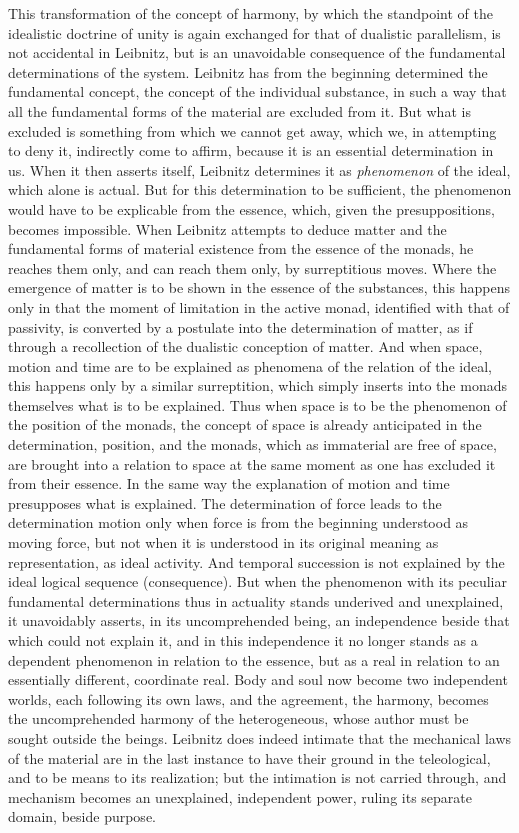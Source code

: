 This transformation of the concept of harmony, by which the standpoint
of the idealistic doctrine of unity is again exchanged for that of
dualistic parallelism, is not accidental in Leibnitz, but is an
unavoidable consequence of the fundamental determinations of the system.
Leibnitz has from the beginning determined the fundamental concept, the
concept of the individual substance, in such a way that all the
fundamental forms of the material are excluded from it. But what is
excluded is something from which we cannot
get away, which we, in attempting to deny it, indirectly come
to affirm, because it is an essential determination in us. When it then
asserts itself, Leibnitz determines it as \emph{phenomenon} of the
ideal, which alone is actual. But for this determination to be
sufficient, the phenomenon would have to be explicable from the
essence, which, given the presuppositions, becomes impossible. When
Leibnitz attempts to deduce matter and the fundamental forms of material
existence from the essence of the monads, he reaches them only, and can
reach them only, by surreptitious moves. Where the emergence of matter
is to be shown in the essence of the substances, this happens only in
that the moment of limitation in the active monad, identified with that
of passivity, is converted by a postulate into the determination of
matter, as if through a recollection of the dualistic conception of
matter. And when space, motion and time are to be explained as
phenomena of the relation of the ideal, this happens only by a similar
surreptition, which simply inserts into the monads themselves what is
to be explained. Thus when space is to be the phenomenon of the
position of the monads, the concept of space is already anticipated in
the determination, position, and the monads, which as immaterial are
free of space, are brought into a relation to space at the same moment
as one has excluded it from their essence. In the same way the
explanation of motion and time presupposes what is explained. The
determination of force leads to the determination motion only when
force is from the beginning understood as moving force, but not when it
is understood in its original meaning as representation, as ideal
activity. And temporal succession is not explained by the ideal logical
sequence (consequence). But when the phenomenon with its peculiar
fundamental determinations thus in actuality stands underived and
unexplained, it unavoidably asserts, in its uncomprehended being, an
independence beside that which could not explain it, and in this
independence it no longer stands as a dependent phenomenon in relation
to the essence, but as a real in relation
to an essentially different, coordinate real. Body and soul
now become two independent worlds, each following its own laws, and the
agreement, the harmony, becomes the uncomprehended harmony of the
heterogeneous, whose author must be sought outside the beings. Leibnitz
does indeed intimate that the mechanical laws of the material are in the
last instance to have their ground in the teleological, and to be means
to its realization; but the intimation is not carried through, and
mechanism becomes an unexplained, independent power, ruling its separate
domain, beside purpose.

